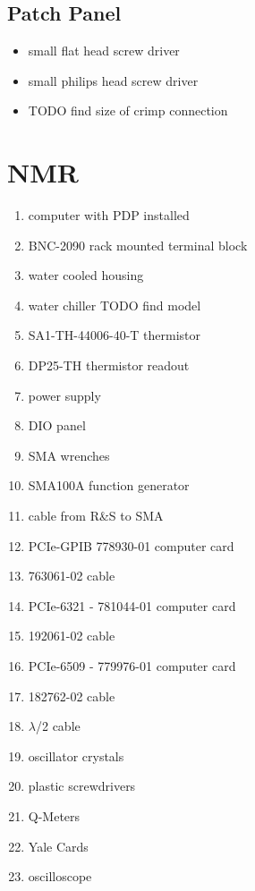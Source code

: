   \subsection{Patch Panel}
\begin{itemize}
 \item small flat head screw driver
 \item small philips head screw driver
\item TODO find size of crimp connection
\end{itemize}

\section{NMR}
\begin{enumerate}
\item computer with PDP installed
\item {} BNC-2090 rack mounted terminal block
\item water cooled housing
\item water chiller TODO find model
\item {} SA1-TH-44006-40-T thermistor
\item {} DP25-TH thermistor readout
\item power supply
\item DIO panel
 \item SMA wrenches
\item {}  SMA100A function generator
\item cable from R\&S to SMA
\item {} PCIe-GPIB 778930-01 computer card
\item {}763061-02 cable
\item {} PCIe-6321 - 781044-01 computer card
\item {} 192061-02 cable
\item {} PCIe-6509 - 779976-01 computer card
\item {} 182762-02 cable
\item $\lambda$/2 cable
\item oscillator crystals
\item plastic screwdrivers
\item Q-Meters
\item Yale Cards
\item oscilloscope
\end{enumerate}


